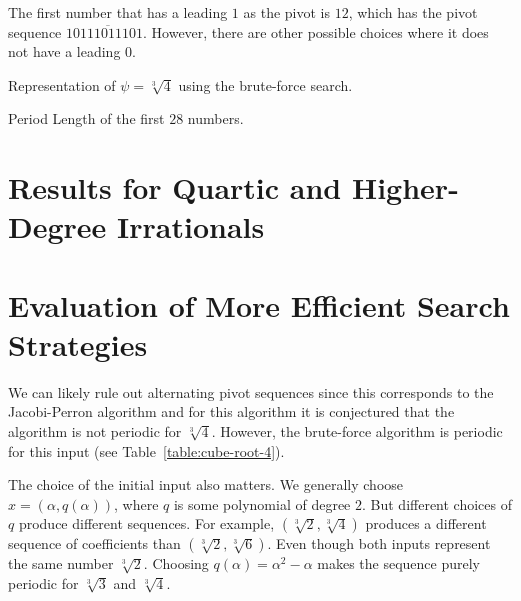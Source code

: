 \begin{remark}
  The first number that has a leading $1$ as the pivot is $12$,
  which has the pivot sequence $1\overline{0111011101}$.
  However, there are other possible choices where it does not have a leading $0$.
\end{remark}

\begin{table}[t]
  \caption{Representation of $ψ = \sqrt[3]{4}$ using the brute-force search.}
  \label{table:cube-root-4}
  \centering
  
\end{table}

\begin{table}[t]
  \caption{Period Length of the first $28$ numbers.}
  \centering
  
\end{table}

\section{Results for Quartic and Higher-Degree Irrationals}

\section{Evaluation of More Efficient Search Strategies}

We can likely rule out alternating pivot sequences since this corresponds to
the Jacobi-Perron algorithm and for this algorithm it is conjectured
\cite{Karpenkov21} that the algorithm is not periodic for $\sqrt[3]{4}$.
However, the brute-force algorithm is periodic for this input (see Table~\ref{table:cube-root-4}).

The choice of the initial input also matters.
We generally choose $x = (α, q(α))$, where $q$ is some polynomial of degree $2$.
But different choices of $q$ produce different sequences.
For example, $(\sqrt[3]{2}, \sqrt[3]{4})$ produces a different sequence of coefficients than $(\sqrt[3]{2}, \sqrt[3]{6})$.
Even though both inputs represent the same number $\sqrt[3]{2}$.
Choosing $q(α) = α^2 - α$ makes the sequence purely periodic for $\sqrt[3]{3}$ and $\sqrt[3]{4}$.
